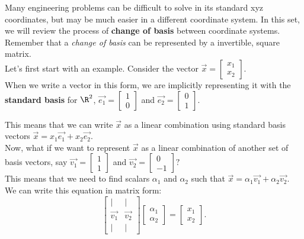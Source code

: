 
Many engineering problems can be difficult to solve in its standard xyz coordinates, but may be much easier in a different coordinate system.
In this set, we will review the process of \textbf{change of basis} between coordinate systems.
Remember that a \emph{change of basis} can be represented by a invertible, square matrix. \\

Let's first start with an example.
Consider the vector $\vec{x} = \begin{bmatrix} x_1 \\ x_2 \end{bmatrix}.$ \\
When we write a vector in this form, we are implicitly representing it with the \textbf{standard basis} for $\R^{2}$, $\vec{e_1} = \begin{bmatrix} 1 \\ 0 \end{bmatrix}$ and $\vec{e_2} = \begin{bmatrix} 0 \\ 1 \end{bmatrix}.$ 

This means that we can write $\vec{x}$ as a linear combination using standard basis vectors $\vec{x} = x_1\vec{e_1} + x_2\vec{e_2}$.\\

Now, what if we want to represent $\vec{x}$ as a linear combination of another set of basis vectors, say $\vec{v_1} = \begin{bmatrix} 1 \\ 1 \end{bmatrix}$ and $\vec{v_2} = \begin{bmatrix} 0 \\ -1 \end{bmatrix}?$ \\

This means that we need to find scalars $\alpha_{1}$ and $\alpha_{2}$ such that $\vec{x} = \alpha_1 \vec{v_1} + \alpha_2 \vec{v_2}$.
We can write this equation in matrix form:
\[
  \begin{bmatrix}
    | & | \\
    \vec{v_1} & \vec{v_2} \\
    | & |
  \end{bmatrix}
  \begin{bmatrix} \alpha_1 \\ \alpha_2 \end{bmatrix} = \begin{bmatrix} x_1 \\ x_2 \end{bmatrix}
.\]

